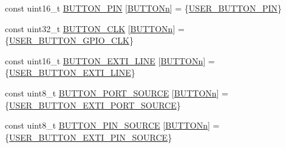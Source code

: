 \begin{DoxyCompactItemize}
\item 
const uint16\+\_\+t \mbox{\hyperlink{group___s_t_m32_f1_x_x___n_u_c_l_e_o___l_o_w___l_e_v_e_l___private___variables_gadf78f2d71408a01f8d30929c2d2da82b}{B\+U\+T\+T\+O\+N\+\_\+\+P\+IN}} \mbox{[}\mbox{\hyperlink{group___s_t_m32_f1_x_x___n_u_c_l_e_o___l_o_w___l_e_v_e_l___b_u_t_t_o_n_ga43d47e509ada64329393005c3be15d64}{B\+U\+T\+T\+O\+Nn}}\mbox{]} = \{\mbox{\hyperlink{group___s_t_m32_f1_x_x___n_u_c_l_e_o___l_o_w___l_e_v_e_l___b_u_t_t_o_n_ga34df6915e3013d6a0c74131d3946b659}{U\+S\+E\+R\+\_\+\+B\+U\+T\+T\+O\+N\+\_\+\+P\+IN}}\}
\item 
const uint32\+\_\+t \mbox{\hyperlink{group___s_t_m32_f1_x_x___n_u_c_l_e_o___l_o_w___l_e_v_e_l___private___variables_gaba532cec9f512c154ac07f1dfa7bfa2f}{B\+U\+T\+T\+O\+N\+\_\+\+C\+LK}} \mbox{[}\mbox{\hyperlink{group___s_t_m32_f1_x_x___n_u_c_l_e_o___l_o_w___l_e_v_e_l___b_u_t_t_o_n_ga43d47e509ada64329393005c3be15d64}{B\+U\+T\+T\+O\+Nn}}\mbox{]} = \{\mbox{\hyperlink{group___s_t_m32_f1_x_x___n_u_c_l_e_o___l_o_w___l_e_v_e_l___b_u_t_t_o_n_gac94af9563fb54d762f1d5351593ee218}{U\+S\+E\+R\+\_\+\+B\+U\+T\+T\+O\+N\+\_\+\+G\+P\+I\+O\+\_\+\+C\+LK}}\}
\item 
const uint16\+\_\+t \mbox{\hyperlink{group___s_t_m32_f1_x_x___n_u_c_l_e_o___l_o_w___l_e_v_e_l___private___variables_ga1760a56d44de70153c4c1a8c785d583b}{B\+U\+T\+T\+O\+N\+\_\+\+E\+X\+T\+I\+\_\+\+L\+I\+NE}} \mbox{[}\mbox{\hyperlink{group___s_t_m32_f1_x_x___n_u_c_l_e_o___l_o_w___l_e_v_e_l___b_u_t_t_o_n_ga43d47e509ada64329393005c3be15d64}{B\+U\+T\+T\+O\+Nn}}\mbox{]} = \{\mbox{\hyperlink{group___s_t_m32_f1_x_x___n_u_c_l_e_o___l_o_w___l_e_v_e_l___b_u_t_t_o_n_gac41d04c2244ba780e4749991c85d1e9a}{U\+S\+E\+R\+\_\+\+B\+U\+T\+T\+O\+N\+\_\+\+E\+X\+T\+I\+\_\+\+L\+I\+NE}}\}
\item 
const uint8\+\_\+t \mbox{\hyperlink{group___s_t_m32_f1_x_x___n_u_c_l_e_o___l_o_w___l_e_v_e_l___private___variables_ga043001d613d9070343f086a1fb778b56}{B\+U\+T\+T\+O\+N\+\_\+\+P\+O\+R\+T\+\_\+\+S\+O\+U\+R\+CE}} \mbox{[}\mbox{\hyperlink{group___s_t_m32_f1_x_x___n_u_c_l_e_o___l_o_w___l_e_v_e_l___b_u_t_t_o_n_ga43d47e509ada64329393005c3be15d64}{B\+U\+T\+T\+O\+Nn}}\mbox{]} = \{\mbox{\hyperlink{group___s_t_m32_f1_x_x___n_u_c_l_e_o___l_o_w___l_e_v_e_l___b_u_t_t_o_n_gadb21b50e395cd0cbede08485aa46a7e1}{U\+S\+E\+R\+\_\+\+B\+U\+T\+T\+O\+N\+\_\+\+E\+X\+T\+I\+\_\+\+P\+O\+R\+T\+\_\+\+S\+O\+U\+R\+CE}}\}
\item 
const uint8\+\_\+t \mbox{\hyperlink{group___s_t_m32_f1_x_x___n_u_c_l_e_o___l_o_w___l_e_v_e_l___private___variables_ga80c29ecf61c61be41ec382cd2a93fcec}{B\+U\+T\+T\+O\+N\+\_\+\+P\+I\+N\+\_\+\+S\+O\+U\+R\+CE}} \mbox{[}\mbox{\hyperlink{group___s_t_m32_f1_x_x___n_u_c_l_e_o___l_o_w___l_e_v_e_l___b_u_t_t_o_n_ga43d47e509ada64329393005c3be15d64}{B\+U\+T\+T\+O\+Nn}}\mbox{]} = \{\mbox{\hyperlink{group___s_t_m32_f1_x_x___n_u_c_l_e_o___l_o_w___l_e_v_e_l___b_u_t_t_o_n_ga228dea1ae32daacecea1c9344ba93cd3}{U\+S\+E\+R\+\_\+\+B\+U\+T\+T\+O\+N\+\_\+\+E\+X\+T\+I\+\_\+\+P\+I\+N\+\_\+\+S\+O\+U\+R\+CE}}\}

\end{DoxyCompactItemize}

